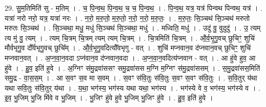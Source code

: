 \documentclass[17pt]{extarticle}
\begin{document}
29. सु॒म॒तिमिति॑ सु - म॒तिम् । . च॒ पि॒न्व॒थ॒ पि॒न्व॒थ॒ च॒ च॒ पि॒न्व॒थ॒ । . पि॒न्व॒थ॒ यत्र॒ यत्र॑ पिन्वथ पिन्वथ॒ यत्र॑ । . यत्रा॑ नरो नरो॒ यत्र॒ यत्रा॑ नरः । . न॒रो॒ म॒रु॒तो॒ म॒रु॒तो॒ न॒रो॒ न॒रो॒ म॒रु॒तः॒ । . म॒रु॒तः॒ सि॒ञ्चथ॑ सि॒ञ्चथ॑ मरुतो मरुतः सि॒ञ्चथ॑ । . सि॒ञ्चथा॒ मधु॒ मधु॑ सि॒ञ्चथ॑ सि॒ञ्चथा॒ मधु॑ । . मध्विति॒ मधु॑ । . उदु॑ वु॒ वुदुदु॑ । . उ॒ त्यम् त्य मु॑ वु॒ त्यम् । . त्यम् चि॒त्रम् चि॒त्रम् त्यम् त्यम् चि॒त्रम् । . चि॒त्रमिति॑ चि॒त्रम् । . औ॒र्व॒भृ॒गु॒वच् छुचिꣳ॒॒ शुचि॑ मौर्वभृगु॒व दौ᳚र्वभृगु॒वच् छुचि᳚म् । . औ॒र्व॒भृ॒गु॒वदित्यौ᳚वभृगु - वत् । . शुचि॑ मप्नवान॒व द॑प्नवान॒वच् छुचिꣳ॒॒ शुचि॑ मप्नवान॒वत् । . अ॒प्न॒वा॒न॒वदा ऽप्न॑वान॒व द॑प्नवान॒वदा । . अ॒प्न॒वा॒न॒वदित्य॑प्नवान - वत् । . आ हु॑वे हुव॒ आ हु॑वे । . हु॒व॒ इति॑ हुवे । . अ॒ग्निꣳ स॑मु॒द्रवा॑ससꣳ समु॒द्रवा॑सस म॒ग्नि म॒ग्निꣳ स॑मु॒द्रवा॑ससम् । . स॒मु॒द्रवा॑सस॒मिति॑ समु॒द्र - वा॒स॒स॒म् । . आ स॒वꣳ स॒व मा स॒वम् । . स॒वꣳ स॑वि॒तुः स॑वि॒तुः स॒वꣳ स॒वꣳ स॑वि॒तुः । . स॒वि॒तुर् य॑था यथा सवि॒तुः स॑वि॒तुर् य॑था । . य॒था॒ भग॑स्य॒ भग॑स्य यथा यथा॒ भग॑स्य । . भग॑स्ये वे व॒ भग॑स्य॒ भग॑स्ये व । . इ॒व॒ भु॒जिम् भु॒जि मि॑वे व भु॒जिम् । . भु॒जिꣳ हु॑वे हुवे भु॒जिम् भु॒जिꣳ हु॑वे । . हु॒व॒ इति॑ हुवे । \newline
\end{document}
